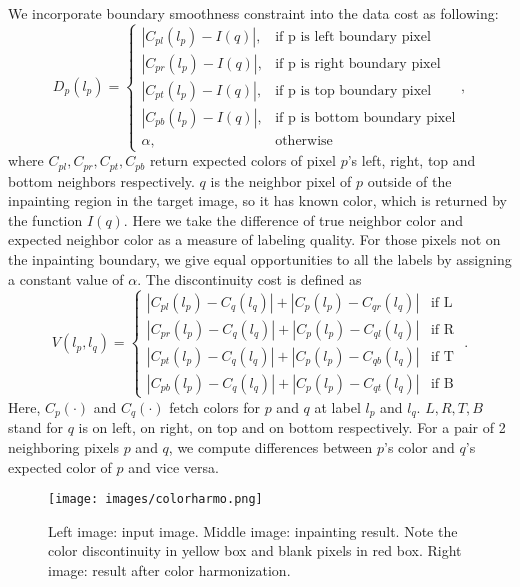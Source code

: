 \documentclass[runningheads]{llncs}
\begin{document}
We incorporate boundary smoothness constraint into the data cost as following:
\begin{equation}
D_p(l_p) = 
\begin{cases}
|C_{pl}(l_p) - I(q)|, & \text{if p is left boundary pixel} \\
|C_{pr}(l_p) - I(q)|, & \text{if p is right boundary pixel} \\
|C_{pt}(l_p) - I(q)|, & \text{if p is top boundary pixel} \\
|C_{pb}(l_p) - I(q)|, & \text{if p is bottom boundary pixel} \\
\alpha, & \text{otherwise}
\end{cases} ,
\end{equation}
where $C_{pl}, C_{pr}, C_{pt}, C_{pb}$ return expected colors of pixel $p$'s left, right, top and bottom neighbors respectively. $q$ is the neighbor pixel of $p$ outside of the inpainting region in the target image, so it has known color, which is returned by the function $I(q)$. Here we take the difference of true neighbor color and expected neighbor color as a measure of labeling quality. For those pixels not on the inpainting boundary, we give equal opportunities to all the labels by assigning a constant value of $\alpha$. The discontinuity cost is defined as
\begin{equation}
V(l_p, l_q) = 
\begin{cases}
|C_{pl}(l_p)-C_{q}(l_q)|+|C_p(l_p)-C_{qr}(l_q)| & \text{if L } \\
|C_{pr}(l_p)-C_{q}(l_q)|+|C_p(l_p)-C_{ql}(l_q)| & \text{if R } \\
|C_{pt}(l_p)-C_{q}(l_q)|+|C_p(l_p)-C_{qb}(l_q)| & \text{if T } \\
|C_{pb}(l_p)-C_{q}(l_q)|+|C_p(l_p)-C_{qt}(l_q)| & \text{if B}
\end{cases} .
\end{equation}
Here, $C_p(\cdot)$ and $C_q(\cdot)$ fetch colors for $p$ and $q$ at label $l_p$ and $l_q$. $L, R, T, B$ stand for $q$ is on left, on right, on top and on bottom respectively. For a pair of 2 neighboring pixels $p$ and $q$, we compute differences between $p$'s color and $q$'s expected color of $p$ and vice versa.





\begin{figure}[t!]
\centering
\texttt{[image: images/colorharmo.png]}
   \caption{Left image: input image. Middle image: inpainting result. Note the color discontinuity in yellow box and blank pixels in red box. Right image: result after color harmonization. }
\label{fig:colorharmo}
\end{figure}
\end{document}
